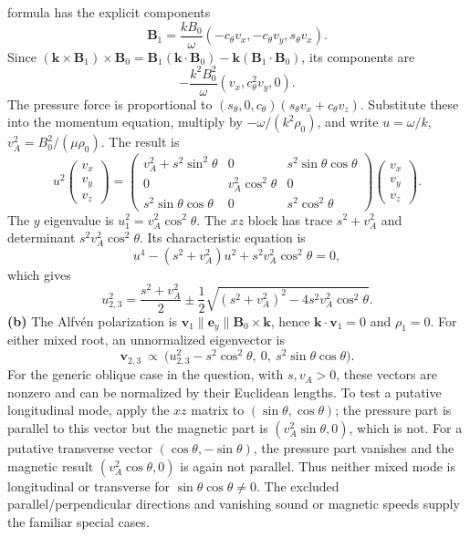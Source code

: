 formula has the explicit components
\[
\mathbf B_1=\frac{kB_0}{\omega}
(-c_\theta v_x,-c_\theta v_y,s_\theta v_x).
\]
Since $(\mathbf k\times\mathbf B_1)\times\mathbf B_0
=\mathbf B_1(\mathbf k\cdot\mathbf B_0)
-\mathbf k(\mathbf B_1\cdot\mathbf B_0)$, its components are
\[
-\frac{k^2B_0^2}{\omega}(v_x,c_\theta^2v_y,0).
\]
The pressure force is proportional to
$(s_\theta,0,c_\theta)(s_\theta v_x+c_\theta v_z)$.
Substitute these into the momentum equation, multiply by
$-\omega/(k^2\rho_0)$, and write $u=\omega/k$,
$v_A^2=B_0^2/(\mu\rho_0)$. The result is
\[
u^2\begin{pmatrix}v_x\\v_y\\v_z\end{pmatrix}
=\begin{pmatrix}
v_A^2+s^2\sin^2\theta&0&s^2\sin\theta\cos\theta\\
0&v_A^2\cos^2\theta&0\\
s^2\sin\theta\cos\theta&0&s^2\cos^2\theta
\end{pmatrix}
\begin{pmatrix}v_x\\v_y\\v_z\end{pmatrix}.
\]
The $y$ eigenvalue is $u_1^2=v_A^2\cos^2\theta$.
The $xz$ block has trace $s^2+v_A^2$ and determinant
$s^2v_A^2\cos^2\theta$. Its characteristic equation is
\[
u^4-(s^2+v_A^2)u^2+s^2v_A^2\cos^2\theta=0,
\]
which gives
\[
\boxed{u_{2,3}^2=\frac{s^2+v_A^2}{2}
\pm\frac12\sqrt{(s^2+v_A^2)^2-4s^2v_A^2\cos^2\theta}.}
\]
\textbf{(b)} The Alfv\'en polarization is
$\mathbf v_1\parallel\mathbf e_y\parallel\mathbf B_0\times\mathbf k$,
hence $\mathbf k\cdot\mathbf v_1=0$ and $\rho_1=0$.
For either mixed root, an unnormalized eigenvector is
\[
\boxed{\mathbf v_{2,3}\ \propto\
\bigl(u_{2,3}^2-s^2\cos^2\theta,\ 0,\
s^2\sin\theta\cos\theta\bigr).}
\]
For the generic oblique case in the question, with $s,v_A>0$,
these vectors are nonzero and can be normalized by their Euclidean
lengths. To test a putative longitudinal mode, apply the $xz$ matrix
to $(\sin\theta,\cos\theta)$; the pressure part is parallel to this
vector but the magnetic part is $(v_A^2\sin\theta,0)$, which is not.
For a putative transverse vector $(\cos\theta,-\sin\theta)$, the
pressure part vanishes and the magnetic result
$(v_A^2\cos\theta,0)$ is again not parallel. Thus neither mixed mode
is longitudinal or transverse for $\sin\theta\cos\theta\ne0$.
The excluded parallel/perpendicular directions and vanishing sound
or magnetic speeds supply the familiar special cases.
